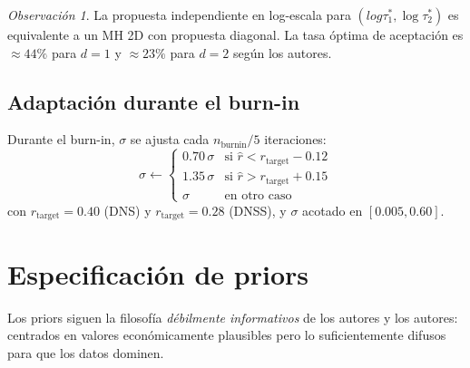 \documentclass[12pt, a4paper]{article}
\theoremstyle{plain}
\theoremstyle{definition}
\theoremstyle{remark}
\newtheorem{observacion}{Observación}[section]
\begin{document}
\begin{observacion}
La propuesta independiente en log-escala para $(log\tau_1^*, \log\tau_2^*)$
es equivalente a un MH 2D con propuesta diagonal. La tasa óptima de
aceptación es $\approx 44\%$ para $d=1$ y $\approx 23\%$ para $d=2$
según los autores.
\end{observacion}

\subsection{Adaptación durante el burn-in}

Durante el burn-in, $\sigma$ se ajusta cada $n_\text{burnin}/5$ iteraciones:
\begin{equation}
  \sigma \leftarrow
  \begin{cases}
    0.70\,\sigma & \text{si } \hat{r} < r_\text{target} - 0.12 \\
    1.35\,\sigma & \text{si } \hat{r} > r_\text{target} + 0.15 \\
    \sigma        & \text{en otro caso}
  \end{cases}
  \label{eq:adapt_sigma}
\end{equation}
con $r_\text{target} = 0.40$ (DNS) y $r_\text{target} = 0.28$ (DNSS),
y $\sigma$ acotado en $[0.005, 0.60]$.

\section{Especificación de priors}

Los priors siguen la filosofía \emph{débilmente informativos} de
los autores y los autores: centrados en
valores económicamente plausibles pero lo suficientemente difusos
para que los datos dominen.
\end{document}
